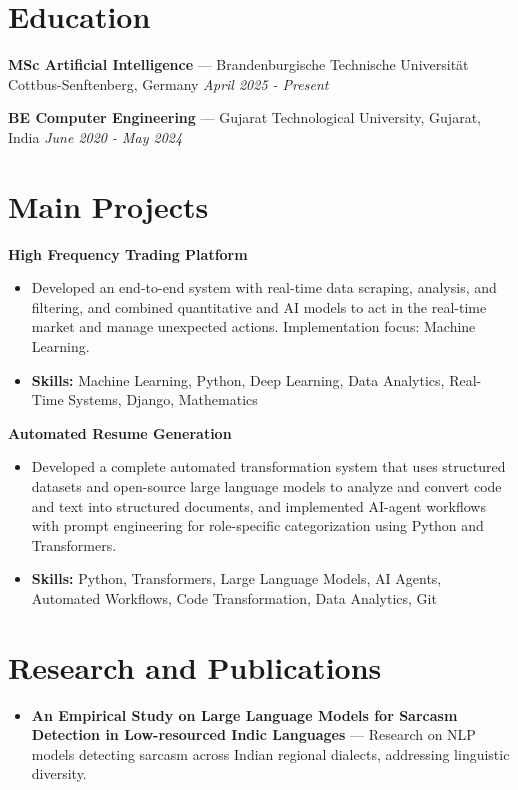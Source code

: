 \documentclass[a4paper,10pt]{article}
\begin{document}
\section*{Education}
\textbf{MSc Artificial Intelligence} — Brandenburgische Technische Universität Cottbus-Senftenberg, Germany \hfill \textit{April 2025 - Present}\par
\vspace{1.5pt}
\textbf{BE Computer Engineering} — Gujarat Technological University, Gujarat, India \hfill \textit{June 2020 - May 2024}\par

\section*{Main Projects}
\textbf{High Frequency Trading Platform}\par
\vspace{1pt}
\begin{itemize}
  \item Developed an end-to-end system with real-time data scraping, analysis, and filtering, and combined quantitative and AI models to act in the real-time market and manage unexpected actions. Implementation focus: Machine Learning.
  \item \textbf{Skills:} Machine Learning, Python, Deep Learning, Data Analytics, Real-Time Systems, Django, Mathematics
\end{itemize}
\vspace{3pt}
\textbf{Automated Resume Generation}\par
\vspace{1pt}
\begin{itemize}
  \item Developed a complete automated transformation system that uses structured datasets and open-source large language models to analyze and convert code and text into structured documents, and implemented AI-agent workflows with prompt engineering for role-specific categorization using Python and Transformers.
  \item \textbf{Skills:} Python, Transformers, Large Language Models, AI Agents, Automated Workflows, Code Transformation, Data Analytics, Git
\end{itemize}

\section*{Research and Publications}
\begin{itemize}
\item \textbf{An Empirical Study on Large Language Models for Sarcasm Detection in Low-resourced Indic Languages} — Research on NLP models detecting sarcasm across Indian regional dialects, addressing linguistic diversity.
\end{itemize}
\end{document}
